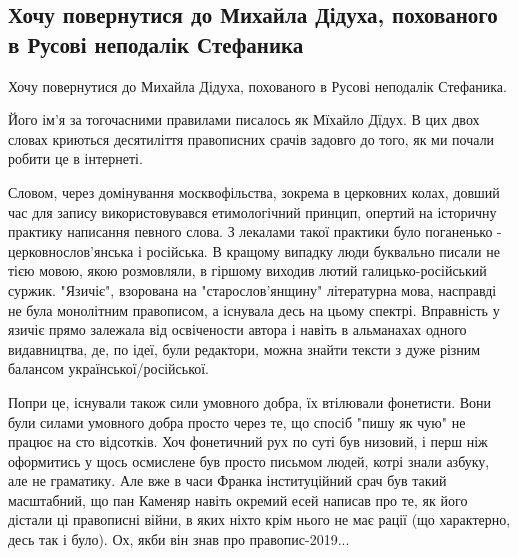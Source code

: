  
 
 
 
 

\subsection{Хочу повернутися до Михайла Дідуха, похованого в Русові неподалік Стефаника}

Хочу повернутися до Михайла Дідуха, похованого в Русові неподалік Стефаника.

Його ім'я за тогочасними правилами писалось як Мїхайло Дїдух. В цих двох словах
криються десятиліття правописних срачів задовго до того, як ми почали робити це
в інтернеті.

Словом, через домінування москвофільства, зокрема в церковних колах, довший час
для запису використовувався етимологічний принцип, опертий на історичну
практику написання певного слова. З лекалами такої практики було поганенько -
церковнослов'янська і російська. В кращому випадку люди буквально писали не
тією мовою, якою розмовляли, в гіршому виходив лютий галицько-російський
суржик. "Язичіє", взорована на "старослов'янщину" літературна мова, насправді
не була монолітним правописом, а існувала десь на цьому спектрі. Вправність у
язичіє прямо залежала від освічености автора і навіть в альманахах одного
видавництва, де, по ідеї, були редактори, можна знайти тексти з дуже різним
балансом української/російської. 

Попри це, існували також сили умовного добра, їх втілювали фонетисти. Вони були
силами умовного добра просто через те, що спосіб "пишу як чую" не працює на сто
відсотків. Хоч фонетичний рух по суті був низовий, і перш ніж оформитись у щось
осмислене був просто письмом людей, котрі знали азбуку, але не граматику. Але
вже в часи Франка інституційний срач був такий масштабний, що пан Каменяр
навіть окремий есей написав про те, як його дістали ці правописні війни, в яких
ніхто крім нього не має рації (що характерно, десь так і було). Ох, якби він
знав про правопис-2019...

